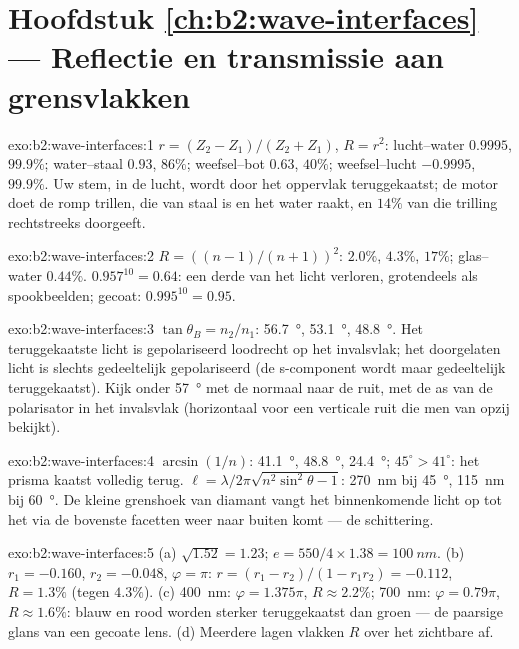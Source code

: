\section*{Hoofdstuk \ref{ch:b2:wave-interfaces} --- Reflectie en transmissie
aan grensvlakken}

\begin{solution}{exo:b2:wave-interfaces:1}
$r = (Z_2 - Z_1)/(Z_2 + Z_1)$, $R = r^2$: lucht--water $0.9995$, $99.9\%$;
water--staal $0.93$, $86\%$; weefsel--bot $0.63$, $40\%$; weefsel--lucht
$-0.9995$, $99.9\%$. Uw stem, in de lucht, wordt door het oppervlak
teruggekaatst; de motor doet de romp trillen, die van staal is en het water
raakt, en $14\%$ van die trilling rechtstreeks doorgeeft.
\end{solution}

\begin{solution}{exo:b2:wave-interfaces:2}
$R = ((n - 1)/(n + 1))^2$: $2.0\%$, $4.3\%$, $17\%$; glas--water $0.44\%$.
$0.957^{10} = 0.64$: een derde van het licht verloren, grotendeels als
spookbeelden; gecoat: $0.995^{10} = 0.95$.
\end{solution}

\begin{solution}{exo:b2:wave-interfaces:3}
$\tan\theta_B = n_2/n_1$: \qty{56.7}{\degree}, \qty{53.1}{\degree},
\qty{48.8}{\degree}. Het teruggekaatste licht is gepolariseerd loodrecht op
het invalsvlak; het doorgelaten licht is slechts gedeeltelijk gepolariseerd
(de s-component wordt maar gedeeltelijk teruggekaatst). Kijk onder
\qty{57}{\degree} met de normaal naar de ruit, met de as van de polarisator
in het invalsvlak (horizontaal voor een verticale ruit die men van opzij
bekijkt).
\end{solution}

\begin{solution}{exo:b2:wave-interfaces:4}
$\arcsin(1/n)$: \qty{41.1}{\degree}, \qty{48.8}{\degree},
\qty{24.4}{\degree}; $45^\circ > 41^\circ$: het prisma kaatst volledig
terug. $\ell = \lambda/2\pi\sqrt{n^2\sin^2\theta - 1}$: \qty{270}{nm} bij
\qty{45}{\degree}, \qty{115}{nm} bij \qty{60}{\degree}. De kleine grenshoek
van diamant vangt het binnenkomende licht op tot het via de bovenste
facetten weer naar buiten komt --- de schittering.
\end{solution}

\begin{solution}{exo:b2:wave-interfaces:5}
(a) $\sqrt{1.52} = 1.23$; $e = 550/4 \times 1.38 = \qty{100}{nm}$. (b)
$r_1 = -0.160$, $r_2 =
-0.048$, $\varphi = \pi$:
$r = (r_1 - r_2)/(1 - r_1r_2) = -0.112$, $R = 1.3\%$ (tegen $4.3\%$). (c)
\qty{400}{nm}: $\varphi = 1.375\pi$, $R \approx 2.2\%$; \qty{700}{nm}:
$\varphi =
0.79\pi$, $R \approx 1.6\%$: blauw en rood worden sterker
teruggekaatst dan groen --- de paarsige glans van een gecoate lens. (d)
Meerdere lagen vlakken $R$ over het zichtbare af.
\end{solution}

